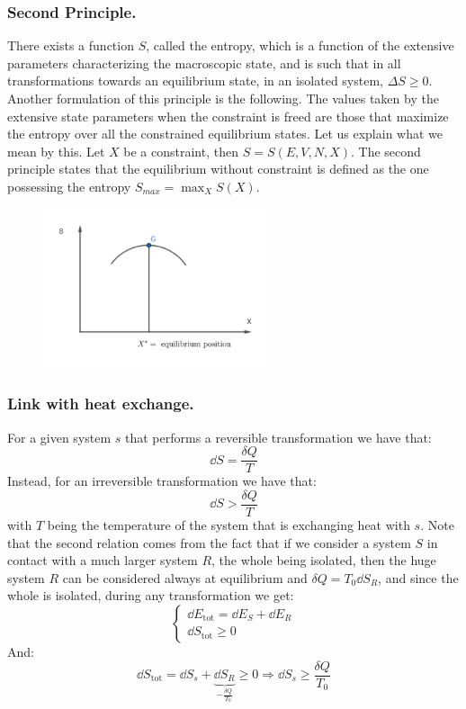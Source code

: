 \documentclass[10pt,a4paper]{book}
\begin{document}
\subsubsection{Second Principle.}
There exists a function $S$, called the entropy, which is a function of the extensive parameters characterizing the macroscopic state, and is such that in all transformations towards an equilibrium state, in an isolated system, $\Delta S \geq 0$.\\
Another formulation of this principle is the following. The values taken by the extensive state parameters when the constraint is freed are those that maximize the entropy over all the constrained equilibrium states. Let us explain what we mean by this. Let $X$ be a constraint, then $S = S(E,V,N,X)$. The second principle states that the equilibrium without constraint is defined as the one possessing the entropy $S_{max}=\max_X S(X)$.\\

\begin{figure}[h!]
\centering
\includegraphics[width = 0.6\textwidth]{graphs/entropy_max}
\end{figure}





\subsubsection{Link with heat exchange.}
For a given system $s$ that performs a reversible transformation we have that:
\[
\dd S = \frac{\delta Q}{T}
\]
Instead, for an irreversible transformation we have that:
\[
\dd S > \frac{\delta Q}{T}
\]
with $T$ being the temperature of the system that is exchanging heat with $s$.
Note that the second relation comes from the fact that if we consider a system $S$ in contact with a much larger system $R$, the whole being isolated, then the huge system $R$ can be considered always at equilibrium and $\delta Q = T_0 \dd S_R$, and since the whole is isolated, during any transformation we get:
\[
\begin{cases}
\dd E_\text{tot} = \dd E_S + \dd E_R\\
\dd S_\text{tot} \geq 0
\end{cases}
\]
And:
\[
\dd S_\text{tot} = \dd S_s + \underbrace{\dd S_R}_{-\frac{\delta Q}{T_0}} \geq 0 \Rightarrow \dd S_s \geq \frac{\delta Q}{T_0}
\]
\end{document}
